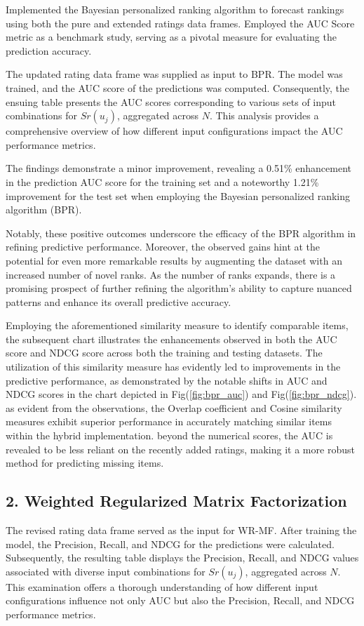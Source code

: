\documentclass[journal]{IEEEtran}
\begin{document}
Implemented the Bayesian personalized ranking \cite{rendle2012bpr} algorithm to forecast rankings using both the pure and extended ratings data frames. 
Employed the AUC Score metric as a benchmark study, serving as a pivotal measure for evaluating the prediction accuracy.

The updated rating data frame was supplied as input to BPR. The model was trained, and the AUC score of the predictions was 
computed. Consequently, the ensuing table presents the AUC scores corresponding to various sets of input combinations for  
\(Sr(u_j)\), aggregated across \(N\). This analysis provides a comprehensive overview of how different input configurations 
impact the AUC performance metrics.

The findings demonstrate a minor improvement, revealing a 0.51\% enhancement in the prediction AUC score for the training set and a 
noteworthy 1.21\% improvement for the test set when employing the Bayesian personalized ranking algorithm (BPR). 

Notably, these positive outcomes underscore the efficacy of the BPR algorithm in refining predictive performance. Moreover, 
the observed gains hint at the potential for even more remarkable results by augmenting the dataset with an increased number 
of novel ranks. As the number of ranks expands, there is a promising prospect of further refining the algorithm's ability 
to capture nuanced patterns and enhance its overall predictive accuracy.


Employing the aforementioned similarity measure to identify comparable items, the subsequent chart illustrates the enhancements 
observed in both the AUC score and NDCG score across both the training and testing datasets. The utilization of this similarity 
measure has evidently led to improvements in the predictive performance, as demonstrated by the notable shifts in AUC and NDCG 
scores in the chart depicted in Fig(\ref{fig:bpr_auc}) and Fig(\ref{fig:bpr_ndcg}). as evident from the observations, the Overlap 
coefficient and Cosine similarity measures exhibit superior performance in accurately matching similar items within the hybrid 
implementation. beyond the numerical scores, the AUC is revealed to be less reliant on the recently added ratings, making it a 
more robust method for predicting missing items.

\subsection*{2. Weighted Regularized Matrix Factorization}
The revised rating data frame served as the input for WR-MF. After training the model, the Precision, Recall, and NDCG for the 
predictions were calculated. Subsequently, the resulting table displays the Precision, Recall, and NDCG values associated with 
diverse input combinations for \(Sr(u_j)\), aggregated across \(N\). This examination offers a thorough understanding of how 
different input configurations influence not only AUC but also the Precision, Recall, and NDCG performance metrics.
\end{document}
